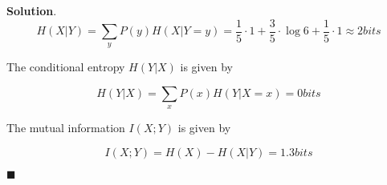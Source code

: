 \documentclass[12pt]{article}
\theoremstyle{definition}
\newenvironment{s}{%
        \begin{trivlist} \item \textbf{Solution}. }{%
            \hspace*{\fill} $\blacksquare$\end{trivlist}}%
\begin{document}
{\begin{s}
\begin{equation*}
H(X|Y) = \sum_{y} P(y)H(X|Y=y) = \frac{1}{5}\cdot 1 + \frac{3}{5}\cdot \log 6 + \frac{1}{5}\cdot 1 \approx 2 \si{bits}
\end{equation*}

The conditional entropy $H(Y|X)$ is given by

\begin{equation*}
H(Y|X) = \sum_{x} P(x)H(Y|X=x) =  0 \si{bits}
\end{equation*}

The mutual information $I(X;Y)$ is given by

\begin{equation*}
I(X;Y) = H(X) - H(X|Y) = 1.3\si{bits}
\end{equation*}


\end{s}
\end{document}

